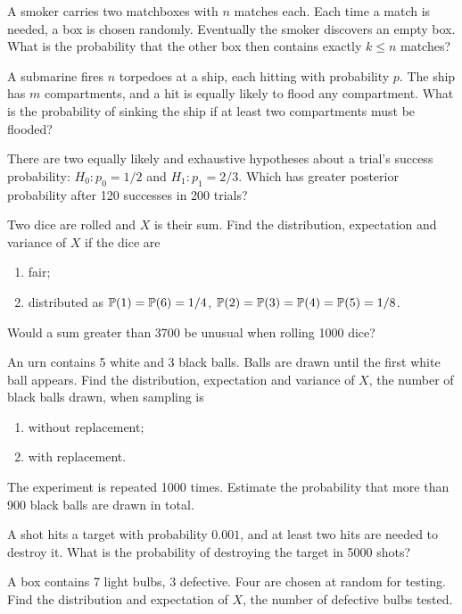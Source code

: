 \documentclass[a4paper]{report}
\begin{document}
\begin{problem}
A smoker carries two matchboxes with $n$ matches each. Each time a match is needed, a box is chosen randomly. Eventually the smoker discovers an empty box. What is the probability that the other box then contains exactly $k\le n$ matches?
\end{problem}
\begin{problem}
A submarine fires $n$ torpedoes at a ship, each hitting with probability $p$. The ship has $m$ compartments, and a hit is equally likely to flood any compartment. What is the probability of sinking the ship if at least two compartments must be flooded?
\end{problem}
\begin{problem}
There are two equally likely and exhaustive hypotheses about a trial's success probability: $H_0:p_0=1/2$ and $H_1:p_1=2/3$. Which has greater posterior probability after 120 successes in 200 trials?
\end{problem}
\begin{problembook}
Two dice are rolled and $X$ is their sum. Find the distribution, expectation and variance of $X$ if the dice are
\begin{enumerate}
\item fair;
\item distributed as $\P(1)=\P(6)=1/4$, $\P(2)=\P(3)=\P(4)=\P(5)=1/8$.
\end{enumerate}
Would a sum greater than 3700 be unusual when rolling 1000 dice?
\end{problembook}
\begin{problem}
An urn contains 5 white and 3 black balls. Balls are drawn until the first white ball appears. Find the distribution, expectation and variance of $X$, the number of black balls drawn, when sampling is
\begin{enumerate}\item without replacement;\item with replacement.\end{enumerate}
The experiment is repeated 1000 times. Estimate the probability that more than 900 black balls are drawn in total.
\end{problem}
\begin{problem}
A shot hits a target with probability $0.001$, and at least two hits are needed to destroy it. What is the probability of destroying the target in 5000 shots?
\end{problem}
\begin{problem}
A box contains 7 light bulbs, 3 defective. Four are chosen at random for testing. Find the distribution and expectation of $X$, the number of defective bulbs tested.
\end{problem}
\end{document}
